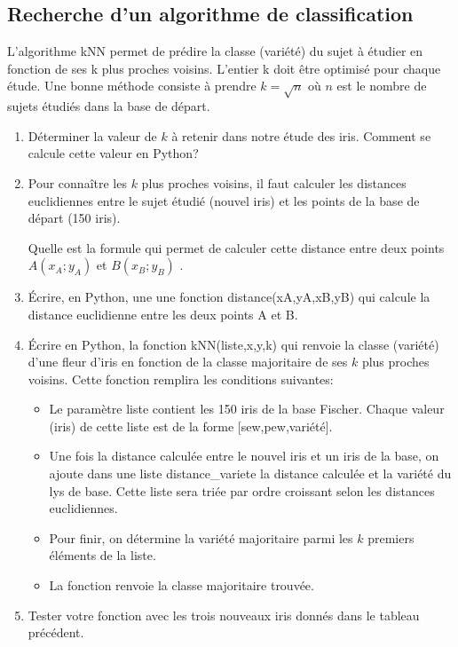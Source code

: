 \documentclass[11pt,a4paper]{article}
\begin{document}
\newpage
\subsection*{Recherche d'un algorithme de classification}

L'algorithme kNN permet de prédire la classe (variété) du sujet à étudier en fonction de ses k plus proches voisins. L'entier k doit être optimisé pour chaque étude. Une bonne méthode consiste à prendre $k=\sqrt{n}$ où $n$ est le nombre de sujets étudiés dans la base de départ.

\begin{enumerate}
\item Déterminer la valeur de $k$ à retenir dans notre étude des iris. Comment se calcule cette valeur en Python?
\vspace{2cm}

\item Pour connaître les $k$ plus proches voisins, il faut calculer les distances euclidiennes entre le sujet étudié (nouvel iris) et les points de la base de départ (150 iris).

Quelle est la formule qui permet de calculer cette distance entre deux points $A(x_{A};y_{A})$ et $B(x_{B};y_{B})$ .
\vspace{2cm}

\item Écrire, en Python, une une fonction \textsf{distance(xA,yA,xB,yB)} qui calcule la distance euclidienne entre les deux points A et B.

\item Écrire en Python, la fonction \textsf{kNN(liste,x,y,k)} qui renvoie la classe (variété) d'une fleur d'iris en fonction de la classe majoritaire de ses $k$ plus proches voisins. Cette fonction remplira les conditions suivantes:

\begin{itemize}
\item Le paramètre \textsf{liste} contient les 150 iris de la base Fischer. Chaque valeur (iris) de cette liste est de la forme \textsf{[sew,pew,variété]}.

\item Une fois la distance calculée entre le nouvel iris et un iris de la base, on ajoute dans une liste \textsf{distance\_variete} la distance calculée et la variété du lys de base. Cette liste sera triée par ordre croissant selon les distances euclidiennes.

\item Pour finir, on détermine la variété majoritaire parmi les $k$ premiers éléments de la liste.

\item La fonction renvoie la classe majoritaire trouvée.
\end{itemize}

\item Tester votre fonction avec les trois nouveaux iris donnés dans le tableau précédent.
\end{enumerate}
\end{document}
